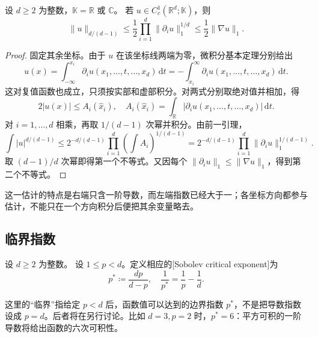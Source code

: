 \begin{theorem}[Gagliardo–Nirenberg–Sobolev，\(p=1\)]\label{b1:thm:gns-endpoint}
设 \(d\geq2\) 为整数，\(\mathbb K=\mathbb R\) 或 \(\mathbb C\)。
若 \(u\in C_c^1(\mathbb R^d;\mathbb K)\)，则
\begin{equation}\label{b1:eq:gns-endpoint}
 \|u\|_{d/(d-1)}
 \leq\frac12\prod_{i=1}^d\|\partial_i u\|_1^{1/d}
 \leq\frac12\|\nabla u\|_1.
\end{equation}
\end{theorem}
\begin{proof}
固定其余坐标。由于 \(u\) 在该坐标线两端为零，微积分基本定理分别给出
\[
 u(x)=\int_{-\infty}^{x_i}\partial_i u(x_1,\ldots,t,\ldots,x_d)\,\mathrm dt
     =-\int_{x_i}^{\infty}\partial_i u(x_1,\ldots,t,\ldots,x_d)\,\mathrm dt.
\]
这对复值函数也成立，只须按实部和虚部积分。对两式分别取绝对值并相加，得
\[
 2|u(x)|\leq
 A_i(\widehat{x}_i),\quad
 A_i(\widehat{x}_i)
 =\int_{\mathbb R}|\partial_i u(x_1,\ldots,t,\ldots,x_d)|\,\mathrm dt.
\]
对 \(i=1,\ldots,d\) 相乘，再取 \(1/(d-1)\) 次幂并积分。由前一引理，
\[
 \int |u|^{d/(d-1)}
 \leq2^{-d/(d-1)}
       \prod_{i=1}^d\left(\int A_i\right)^{1/(d-1)}
 =2^{-d/(d-1)}
       \prod_{i=1}^d\|\partial_i u\|_1^{1/(d-1)}.
\]
取 \((d-1)/d\) 次幂即得第一个不等式。又因每个
\(\|\partial_i u\|_1\leq\|\nabla u\|_1\)，得到第二个不等式。
\end{proof}

这一估计的特点是右端只含一阶导数，而左端指数已经大于一；各坐标方向都参与估计，不能只在一个方向积分后便把其余变量略去。

\subsection{临界指数}
\label{b1:subsec:240202}

\begin{definition}\label{b1:def:sobolev-critical-exponent}
设 \(d\geq2\) 为整数。
设 \(1\leq p<d\)。定义相应的[Sobolev critical exponent]为
\begin{equation}\label{b1:eq:sobolev-critical-exponent}
 p^*\coloneqq\frac{dp}{d-p},\quad
 \frac1{p^*}=\frac1p-\frac1d.
\end{equation}
\end{definition}

这里的“临界”指给定 \(p<d\) 后，函数值可以达到的边界指数 \(p^*\)，不是把导数指数设成 \(p=d\)。后者将在另行讨论。比如 \(d=3,p=2\) 时，\(p^*=6\)：平方可积的一阶导数将给出函数的六次可积性。

